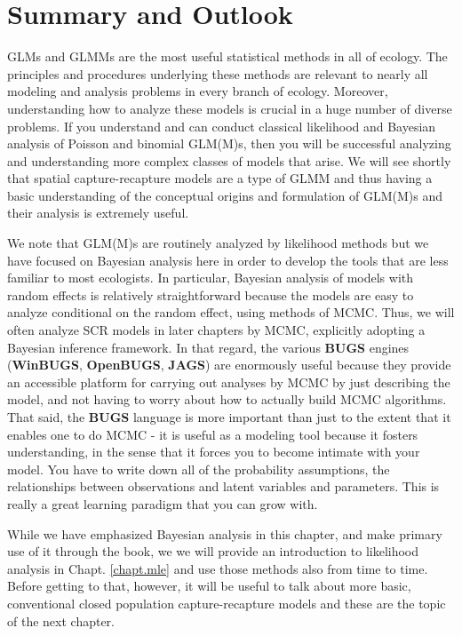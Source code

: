 \section{ Summary and Outlook}

GLMs and GLMMs are the most useful statistical methods in all of
ecology. The principles and procedures underlying these methods are
relevant to nearly all modeling and analysis problems in every branch
of ecology. Moreover, understanding how to analyze these models is
crucial in a huge number of diverse problems. If you understand and
can conduct classical likelihood and Bayesian analysis of Poisson and
binomial GLM(M)s, then you will be successful analyzing and
understanding more complex classes of models that arise. We will see
shortly that spatial capture-recapture models are a type of GLMM
and thus having a basic
understanding of the conceptual origins and formulation of GLM(M)s and
their analysis is extremely useful.

We note that GLM(M)s are routinely
analyzed by likelihood methods but we have focused on Bayesian
analysis here in order to develop the tools that are less familiar to
most ecologists.  In particular, Bayesian analysis of models with random
effects is relatively straightforward because the models
are easy to analyze conditional on the random effect, using methods of
MCMC.  Thus, we will often analyze SCR models in later chapters by
MCMC, explicitly adopting a Bayesian inference framework.
In that regard, the various {\bf BUGS} engines ({\bf WinBUGS}, {\bf
  OpenBUGS}, {\bf JAGS}) are enormously useful because they
provide an accessible platform for
carrying out  analyses by MCMC by just
describing the model, and not having to worry about how to actually
build MCMC algorithms.  That said, the {\bf BUGS} language is more important
than just to the extent that it enables one to do MCMC - it is useful
as a modeling tool because it fosters understanding, in the sense that
it forces you to become intimate with your model. You have to write
down all of the probability assumptions, the relationships between
observations and latent variables and parameters. This is really a
great learning paradigm that you can grow with.

While we have emphasized Bayesian analysis in this chapter, and make
primary use of it through the book, we
we will provide an introduction to likelihood analysis in Chapt.
\ref{chapt.mle} and use those  methods also from time to time.
 Before getting to that, however, it will be useful to
talk about more basic, conventional closed population
capture-recapture models and these are the topic of the next chapter.
